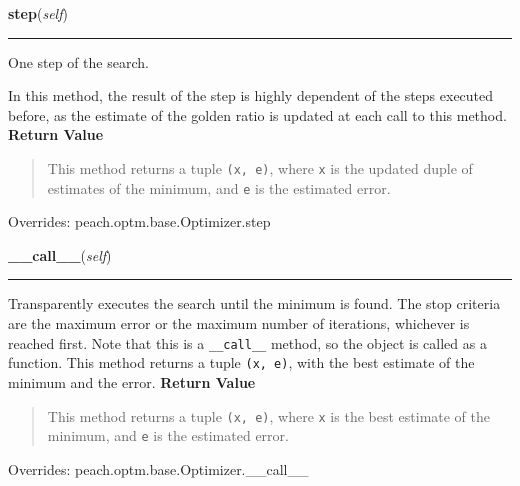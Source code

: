 \hspace{.8\funcindent}\begin{boxedminipage}{\funcwidth}

    \raggedright \textbf{step}(\textit{self})

    \vspace{-1.5ex}

    \rule{\textwidth}{0.5\fboxrule}
\setlength{\parskip}{2ex}

One step of the search.

In this method, the result of the step is highly dependent of the steps
executed before, as the estimate of the golden ratio is updated at each
call to this method.
\setlength{\parskip}{1ex}
      \textbf{Return Value}
    \vspace{-1ex}

      \begin{quote}

This method returns a tuple \texttt{(x, e)}, where \texttt{x} is the updated
duple of estimates of the minimum, and \texttt{e} is the estimated error.
      \end{quote}

      Overrides: peach.optm.base.Optimizer.step

    \end{boxedminipage}

    \vspace{0.5ex}

\hspace{.8\funcindent}\begin{boxedminipage}{\funcwidth}

    \raggedright \textbf{\_\_call\_\_}(\textit{self})

    \vspace{-1.5ex}

    \rule{\textwidth}{0.5\fboxrule}
\setlength{\parskip}{2ex}

Transparently executes the search until the minimum is found. The stop
criteria are the maximum error or the maximum number of iterations,
whichever is reached first. Note that this is a \texttt{\_\_call\_\_} method, so
the object is called as a function. This method returns a tuple
\texttt{(x, e)}, with the best estimate of the minimum and the error.
\setlength{\parskip}{1ex}
      \textbf{Return Value}
    \vspace{-1ex}

      \begin{quote}

This method returns a tuple \texttt{(x, e)}, where \texttt{x} is the best
estimate of the minimum, and \texttt{e} is the estimated error.
      \end{quote}

      Overrides: peach.optm.base.Optimizer.\_\_call\_\_

    \end{boxedminipage}


